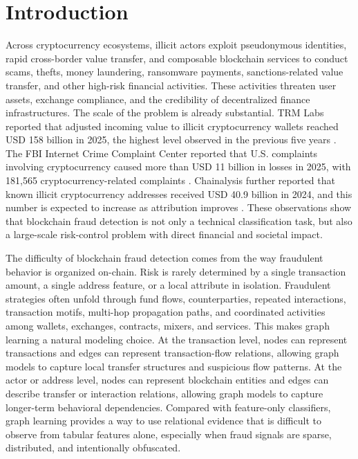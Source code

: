 \section{Introduction}

Across cryptocurrency ecosystems, illicit actors exploit pseudonymous identities, rapid cross-border value transfer, and composable blockchain services to conduct scams, thefts, money laundering, ransomware payments, sanctions-related value transfer, and other high-risk financial activities. These activities threaten user assets, exchange compliance, and the credibility of decentralized finance infrastructures. The scale of the problem is already substantial. TRM Labs reported that adjusted incoming value to illicit cryptocurrency wallets reached USD 158 billion in 2025, the highest level observed in the previous five years \cite{trmlabs2026crypto}. The FBI Internet Crime Complaint Center reported that U.S. complaints involving cryptocurrency caused more than USD 11 billion in losses in 2025, with 181,565 cryptocurrency-related complaints \cite{fbi2026crypto}. Chainalysis further reported that known illicit cryptocurrency addresses received USD 40.9 billion in 2024, and this number is expected to increase as attribution improves \cite{chainalysis2025crypto}. These observations show that blockchain fraud detection is not only a technical classification task, but also a large-scale risk-control problem with direct financial and societal impact.

The difficulty of blockchain fraud detection comes from the way fraudulent behavior is organized on-chain. Risk is rarely determined by a single transaction amount, a single address feature, or a local attribute in isolation. Fraudulent strategies often unfold through fund flows, counterparties, repeated interactions, transaction motifs, multi-hop propagation paths, and coordinated activities among wallets, exchanges, contracts, mixers, and services. This makes graph learning a natural modeling choice. At the transaction level, nodes can represent transactions and edges can represent transaction-flow relations, allowing graph models to capture local transfer structures and suspicious flow patterns. At the actor or address level, nodes can represent blockchain entities and edges can describe transfer or interaction relations, allowing graph models to capture longer-term behavioral dependencies. Compared with feature-only classifiers, graph learning provides a way to use relational evidence that is difficult to observe from tabular features alone, especially when fraud signals are sparse, distributed, and intentionally obfuscated.

